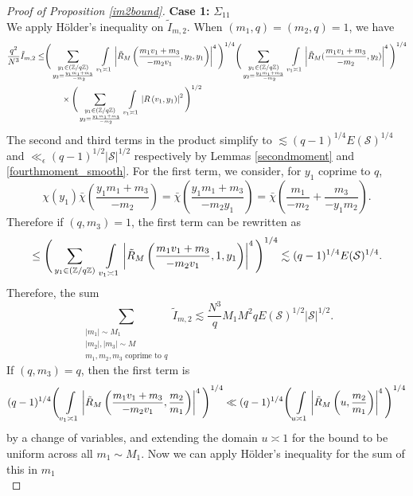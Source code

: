 \begin{proof}[{Proof of Proposition \ref{im2bound}}]
    \textbf{Case 1:} $\Sigma_{11}$\\
    We apply H\"older's inequality on $\tilde{I}_{m,2}$. When $(m_1,q)=(m_2,q)=1$, we have \begin{align*}
        \frac{q^2}{N^3}\tilde{I}_{m,2}\leq &
       \Bigg( \sum_{\substack{y_1\in (\mathbb{Z}/q\mathbb{Z})\\y_2=\frac{y_1m_1+m_3}{-m_2}}} \ \int\displaylimits_{v_1\asymp 1}  \left| \tilde{R}_M\left(\frac{m_1v_1+m_3}{-m_2v_1},y_2,y_1\right)\right|^4\Bigg)^{1/4}
       \Bigg( \sum_{\substack{y_1\in (\mathbb{Z}/q\mathbb{Z})\\y_2=\frac{y_1m_1+m_3}{-m_2}}} \ \int\displaylimits_{v_1\asymp 1} \left|\tilde{R}_M(\frac{m_1v_1+m_3}{-m_2},y_2)\right|^4\Bigg)^{1/4}\\
        & \quad \quad    \times     \Bigg(\sum_{\substack{y_1\in (\mathbb{Z}/q\mathbb{Z})\\y_2=\frac{y_1m_1+m_3}{-m_2}}} \ \int\displaylimits_{v_1\asymp 1} \left|R\left(v_1,y_1\right)\right| ^2\Bigg)^{1/2}
    \end{align*}
    The second and third terms in the product simplify to $\lesssim (q-1)^{1/4}E(\mathcal{S})^{1/4}$ and $\ll_\epsilon (q-1)^{1/2}|\mathcal{S}|^{1/2}$ respectively by Lemmas \ref{secondmoment} and \ref{fourthmoment_smooth}. For the first term, we consider, for $y_1$ coprime to $q$, \[
    \chi(y_1)\bar{\chi}\left(\frac{y_1m_1+m_3}{-m_2}\right) = \bar{\chi}\left(\frac{y_1m_1+m_3}{-m_2y_1}\right)=\bar{\chi}\left(\frac{m_1}{-m_2}+\frac{m_3}{-y_1m_2}\right). 
    \]
    Therefore if $(q,m_3)=1$, the first term can be rewritten as \[
        \leq \Bigg( \sum_{y_1\in (\mathbb{Z}/q\mathbb{Z})} \ \int\displaylimits_{v_1\asymp 1}  \left| \tilde{R}_M\left(\frac{m_1v_1+m_3}{-m_2v_1},1,y_1\right)\right|^4\Bigg)^{1/4} \lesssim(q-1)^{1/4} E(\mathcal{S})^{1/4}.
    \]
    Therefore, the sum \[
    \sum_{\substack{|m_1|\sim M_1\\|m_2|,|m_3|\sim M\\
    m_1,m_2,m_3 \textrm{ coprime to } q}} \tilde{I}_{m,2} \lesssim \frac{N^3}{q}M_1M^2q E(\mathcal{S})^{1/2}|\mathcal{S}|^{1/2}.
    \]
    If $(q,m_3)=q$, then the first term is \[
        (q-1)^{1/4}\Bigg(\int\displaylimits_{v_1\asymp 1}  \left| \tilde{R}_M\left(\frac{m_1v_1+m_3}{-m_2v_1},\frac{m_2}{m_1}\right)\right|^4\Bigg)^{1/4}\ll (q-1)^{1/4}\Bigg(\int\displaylimits_{u\asymp 1}  \left| \tilde{R}_M\left(u,\frac{m_2}{m_1}\right)\right|^4\Bigg)^{1/4}
    \]by a change of variables, and extending the domain $u\asymp 1$ for the bound to be uniform across all $m_1\sim M_1$. Now we can apply H\"older's inequality for the sum of this in $m_1$ \[
\]
\end{proof}
